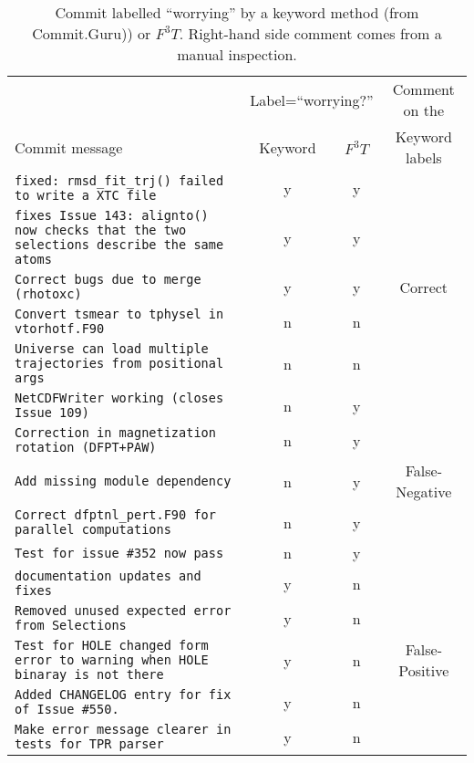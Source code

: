 \begin{table*}
\scriptsize
\begin{center}
\caption{Commit labelled  ``worrying'' by 
a keyword method (from Commit.Guru\cite{commitguru})) or   $F^3T$. 
Right-hand side comment comes from a manual inspection.}
\begin{tabular}{l|cc|c}
\renewcommand{\baselinestretch}{0.5}
  \rowcolor{gray!30}               & \multicolumn{2}{|c|}{Label=``worrying?''} & Comment on the\\
 \rowcolor{gray!30} Commit message & Keyword & $F^3T$ &  Keyword labels\\ 
\hline
\texttt{fixed: rmsd\_fit\_trj() failed to write a XTC file} & y & y &   \\ 
\texttt{fixes Issue 143: alignto() now checks that the two selections describe the same atoms} & y &	y &   \\ 
\texttt{Correct bugs due to merge (rhotoxc)}	& y &	y & Correct\\ 
\texttt{Convert tsmear to tphysel in vtorhotf.F90} &	n &	n &  \\ 
\texttt{Universe can load multiple trajectories from positional args} &	n &	n &   \\ \hline
\texttt{NetCDFWriter working (closes Issue 109)}	& n &	y &  \\ 
\texttt{Correction in magnetization rotation (DFPT+PAW)} &	n &	y &  \\
\texttt{Add missing module dependency} &	n &	y & False-Negative\\ 
\texttt{Correct dfptnl\_pert.F90 for parallel computations} &	n &	y &  \\ 
\texttt{Test for issue \#352 now pass} &	n &	y &  \\ \hline
\texttt{documentation updates and fixes} &	y &	n &   \\ 
\texttt{Removed unused expected error from Selections} &	y &	n &   \\ 
\texttt{Test for HOLE changed form error to warning when HOLE binaray is not there} &	y &	n & False-Positive  \\ 
\texttt{Added CHANGELOG entry for fix of Issue \#550.} &	y &	n &  \\ 
\texttt{Make error message clearer in tests for TPR parser} &	y &	n &   \\ \hline
\end{tabular}
\label{tbl:sample}
\end{center} 
\end{table*}